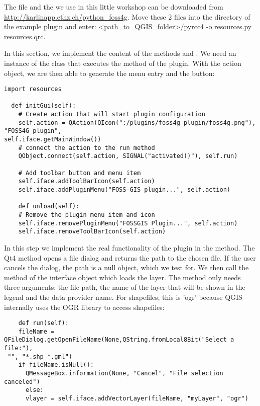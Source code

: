 The file  and the  we use in
this little workshop can be downloaded from
\url{http://karlinapp.ethz.ch/python\_foss4g}. Move these 2 files into the
directory of the example plugin
 and enter: <path\_to\_QGIS\_folder>/pyrcc4 -o
resources.py resources.qrc.


In this section, we implement the content of the methods  and
. We need an instance of the class  that executes the
 method of the plugin. With the action object, we are then able to
generate the menu entry and the button:

\begin{verbatim}
import resources

  def initGui(self):
    # Create action that will start plugin configuration
    self.action = QAction(QIcon(":/plugins/foss4g_plugin/foss4g.png"), "FOSS4G plugin",
self.iface.getMainWindow())
    # connect the action to the run method
    QObject.connect(self.action, SIGNAL("activated()"), self.run)

    # Add toolbar button and menu item
    self.iface.addToolBarIcon(self.action)
    self.iface.addPluginMenu("FOSS-GIS plugin...", self.action)

    def unload(self):
    # Remove the plugin menu item and icon
    self.iface.removePluginMenu("FOSSGIS Plugin...", self.action)
    self.iface.removeToolBarIcon(self.action)
\end{verbatim}


In this step we implement the real functionality of the plugin in the
 method. The Qt4 method 
opens a file dialog and returns the path to the chosen file. If the user
cancels the dialog, the path is a null object, which we test for. We then
call the method  of the interface object which loads
the layer. The method only needs three arguments: the file path, the name of
the layer that will be shown in the legend and the data provider name. For
shapefiles, this is 'ogr' because QGIS internally uses the OGR library to
access shapefiles:

\begin{verbatim}
    def run(self):
    fileName = QFileDialog.getOpenFileName(None,QString.fromLocal8Bit("Select a file:"),
 "", "*.shp *.gml")
    if fileName.isNull():
      QMessageBox.information(None, "Cancel", "File selection canceled")
      else:
      vlayer = self.iface.addVectorLayer(fileName, "myLayer", "ogr")
\end{verbatim}

